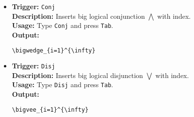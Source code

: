 \documentclass{article}
\begin{document}
\begin{itemize}[leftmargin=*, label={}]
\item \textbf{Trigger:} \texttt{Conj} \\
\textbf{Description:} Inserts big logical conjunction \(\bigwedge\) with index. \\
\textbf{Usage:} Type \texttt{Conj} and press \texttt{Tab}. \\
\textbf{Output:}
\begin{verbatim}
\bigwedge_{i=1}^{\infty}
\end{verbatim}

\item \textbf{Trigger:} \texttt{Disj} \\
\textbf{Description:} Inserts big logical disjunction \(\bigvee\) with index. \\
\textbf{Usage:} Type \texttt{Disj} and press \texttt{Tab}. \\
\textbf{Output:}
\begin{verbatim}
\bigvee_{i=1}^{\infty}
\end{verbatim}
\end{itemize}
\end{document}
